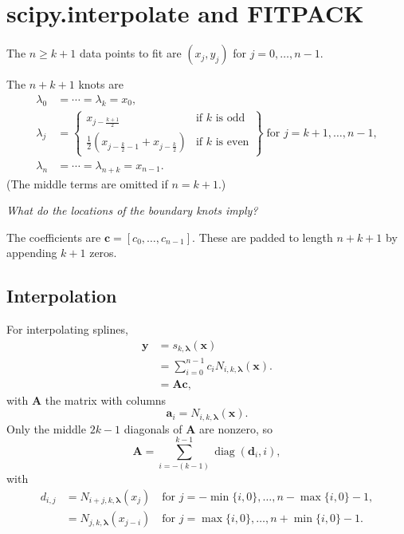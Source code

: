 \documentclass{article}
\renewcommand{\vec}[1]{\bm{#1}}
\newcommand{\mat}[1]{\bm{#1}}
\DeclareMathOperator{\diag}{diag}
\begin{document}
\section{scipy.interpolate and FITPACK}

The $n \geq k + 1$ data points to fit are $(x_j, y_j)$
for $j = 0, \ldots, n - 1$.

The $n + k + 1$ knots are
\begin{equation}
  \begin{split}
    \lambda_0 &= \cdots = \lambda_k
    = x_0,
    \\
    \lambda_j
    &=
    \left\{
      \begin{array}{ll}
        x_{j - \frac{k+1}{2}}
        & \text{if $k$ is odd}
        \\
        \frac{1}{2}
        \left(
          x_{j - \frac{k}{2} - 1} + x_{j - \frac{k}{2}}
        \right)
        & \text{if $k$ is even}
      \end{array}
    \right\}
    \;
    \text{for $j = k+1, \ldots, n-1$},
    \\
    \lambda_n &= \cdots = \lambda_{n + k} = x_{n-1}.
  \end{split}
\end{equation}
(The middle terms are omitted if $n = k + 1$.)

\emph{What do the locations of the boundary knots imply?}

The coefficients are $\vec{c} = [c_0, \ldots, c_{n-1}]$.  These
are padded to length $n + k + 1$ by appending $k + 1$ zeros.


\subsection{Interpolation}

For interpolating splines,
\begin{equation}
  \begin{split}
    \vec{y}
    &= s_{k, \vec{\lambda}}(\vec{x})
    \\
    &= \sum_{i=0}^{n-1} c_i
    N_{i, k, \vec{\lambda}}(\vec{x}).
    \\
    &= \mat{A} \vec{c},
  \end{split}
\end{equation}
with $\mat{A}$ the matrix with columns
\begin{equation}
  \vec{a}_i
  =
  N_{i, k, \vec{\lambda}}(\vec{x}).
\end{equation}
Only the middle $2 k - 1$ diagonals of $\mat{A}$ are nonzero, so
\begin{equation}
  \mat{A}
  =
  \sum_{i = -(k-1)}^{k-1}
  \diag(\vec{d}_i, i),
\end{equation}
with
\begin{equation}
  \begin{split}
    d_{i, j}
    &=
    N_{i + j, k, \vec{\lambda}}(x_j)
    \quad
    \text{for $j = - \min\{i, 0\}, \ldots, n - \max\{i, 0\} - 1$},
    \\
    &=
    N_{j, k, \vec{\lambda}}(x_{j - i})
    \quad
    \text{for $j = \max\{i, 0\}, \ldots, n + \min\{i, 0\} - 1$}.
  \end{split}
\end{equation}
\end{document}

